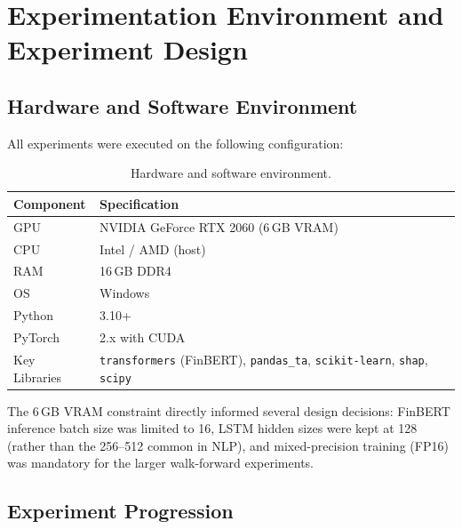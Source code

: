 \chapter{Experimentation Environment and Experiment Design}
\label{ch:experiments}

\section{Hardware and Software Environment}
\label{sec:hardware}

All experiments were executed on the following configuration:

\begin{table}[htbp]
\centering
\caption{Hardware and software environment.}
\label{tab:environment}
\begin{tabular}{@{}ll@{}}
\toprule
\textbf{Component}  & \textbf{Specification} \\
\midrule
GPU                  & NVIDIA GeForce RTX 2060 (6\,GB VRAM) \\
CPU                  & Intel / AMD (host) \\
RAM                  & 16\,GB DDR4 \\
OS                   & Windows \\
Python               & 3.10+ \\
PyTorch              & 2.x with CUDA \\
Key Libraries        & \texttt{transformers} (FinBERT), \texttt{pandas\_ta},
                       \texttt{scikit-learn}, \texttt{shap}, \texttt{scipy} \\
\bottomrule
\end{tabular}
\end{table}

\noindent
The 6\,GB VRAM constraint directly informed several design decisions:
FinBERT inference batch size was limited to 16, LSTM hidden sizes were kept at
128 (rather than the 256--512 common in NLP), and mixed-precision training
(FP16) was mandatory for the larger walk-forward experiments.

\section{Experiment Progression}
\label{sec:experiment-progression}


